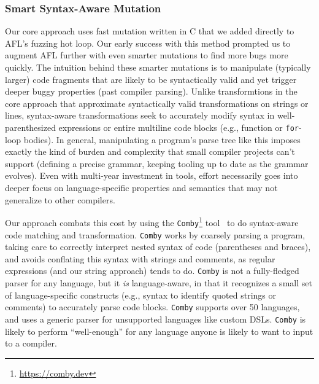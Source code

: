 \subsubsection{Smart Syntax-Aware Mutation}
\label{strat-syntax-aware}

\begin{sloppypar}
Our core approach uses fast mutation written in C that we added directly to
AFL's fuzzing hot loop. Our early success with this method prompted us to
augment AFL further with even smarter mutations to find more bugs more quickly.
The intuition behind these smarter mutations is to manipulate (typically
larger) code fragments that are likely to be syntactically valid and yet
trigger deeper buggy properties (past compiler parsing). Unlike transformtions
in the core approach that approximate syntactically valid transformations on
strings or lines, syntax-aware transformations seek to accurately modify syntax
in well-parenthesized expressions or entire multiline code blocks (e.g.,
function or \texttt{for}-loop bodies). In general, manipulating a program's
parse tree like this imposes exactly the kind of burden and complexity that
small compiler projects can't support (defining a precise grammar, keeping
tooling up to date as the grammar evolves). Even with multi-year investment in
tools, effort necessarily goes into deeper focus on
language-specific properties and semantics %
that may not generalize to other compilers.
\end{sloppypar}

\begin{sloppypar}
Our approach combats this cost by using the
\texttt{Comby}\footnote{\href{https://comby.dev}{https://comby.dev}} tool~\cite{combypaper} to do
syntax-aware code matching and transformation. \texttt{Comby} works by coarsely
parsing a program, taking care to correctly interpret nested syntax of code
(parentheses and braces), and avoids conflating this syntax with strings and
comments, as regular expressions (and our string approach) tends to do.  \texttt{Comby} is not a fully-fledged
parser for any language, but it \emph{is} language-aware, in that it recognizes
a small set of language-specific constructs (e.g., syntax to identify quoted
strings or comments) to accurately parse code blocks. \texttt{Comby} supports
over 50 languages, and uses a generic parser for unsupported languages like custom
DSLs. \texttt{Comby} is likely to perform ``well-enough'' for any language
anyone is likely to want to input to a compiler.
\end{sloppypar}

